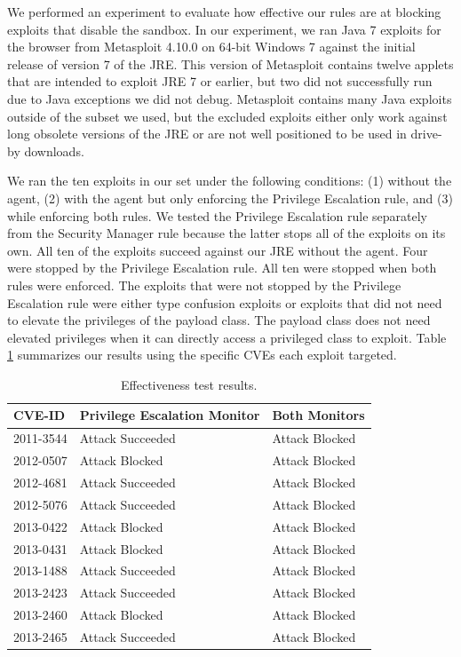 \documentclass{sig-alternate}
\begin{document}

We performed an experiment to evaluate how effective our rules are
at blocking exploits that disable the sandbox. In our experiment,
we ran Java 7 exploits for the browser from Metasploit 4.10.0 on 64-bit
Windows 7 against the initial release of version 7 of the JRE. This
version of Metasploit contains twelve applets that are intended to
exploit JRE 7 or earlier, but two did not successfully run due to
Java exceptions we did not debug. Metasploit contains many Java exploits
outside of the subset we used, but the excluded exploits either only
work against long obsolete versions of the JRE or are not well positioned
to be used in drive-by downloads. 

We ran the ten exploits in our set under the following conditions:
(1) without the agent, (2) with the agent but only enforcing the Privilege
Escalation rule, and (3) while enforcing both rules. We tested the Privilege Escalation rule separately from the Security Manager rule because the latter stops all of the exploits on its own. All
ten of the exploits succeed against our JRE without the agent. Four
were stopped by the Privilege Escalation rule. All ten were stopped
when both rules were enforced. The exploits that were not stopped
by the Privilege Escalation rule were either type confusion exploits
or exploits that did not need to elevate the privileges of the payload
class. The payload class does not need elevated privileges when it
can directly access a privileged class to exploit. Table \ref{tab:Exploit-experiment-summary}
summarizes our results using the specific CVEs each exploit targeted.

\begin{table}
\protect\caption{Effectiveness test results.}\label{tab:Exploit-experiment-summary}


\centering{}%
\begin{tabular}{l>{\raggedright}p{3cm}l}
\toprule 
\textbf{CVE-ID} & \textbf{Privilege Escalation Monitor} & \textbf{Both Monitors}\tabularnewline
\midrule
2011-3544 & Attack Succeeded  & Attack Blocked\tabularnewline
2012-0507 & Attack Blocked & Attack Blocked\tabularnewline
2012-4681 & Attack Succeeded  & Attack Blocked\tabularnewline
2012-5076 & Attack Succeeded  & Attack Blocked\tabularnewline
2013-0422 & Attack Blocked & Attack Blocked\tabularnewline
2013-0431 & Attack Blocked & Attack Blocked\tabularnewline
2013-1488 & Attack Succeeded  & Attack Blocked\tabularnewline
2013-2423 & Attack Succeeded  & Attack Blocked\tabularnewline
2013-2460 & Attack Blocked & Attack Blocked\tabularnewline
2013-2465 & Attack Succeeded  & Attack Blocked\tabularnewline
\bottomrule
\end{tabular}
\end{table}
\end{document}
